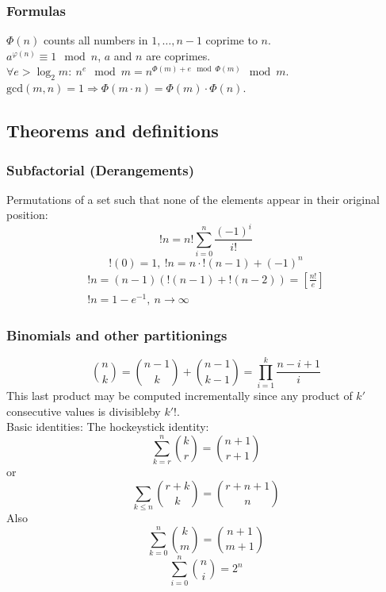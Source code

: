 \documentclass[
	a4paper,
	landscape,
	10pt,
]{article}
\begin{document}
\begin{multicols}{3}
		\subsubsection*{Formulas}
			$\Phi(n)$ counts all numbers in ${1,\hdots,n-1}$ coprime to $n$. \\
			$a^{\varphi (n)} \equiv 1 \mod n$, $a$ and $n$ are coprimes. \\
			$\forall e > \log_2 m:~ n^e \mod m = n^{\Phi(m) + e \mod \Phi(m)} \mod m$. \\
			$\text{gcd}(m,n) = 1 \Rightarrow \Phi(m\cdot n) = \Phi(m) \cdot \Phi(n)$. \\


	\subsection{Theorems and definitions}
		\subsubsection*{Subfactorial (Derangements)}
		Permutations of a set such that none of the elements appear in
		their original position:
		$$!n = n! \sum_{i=0}^{n} \frac{(-1)^i}{i!}$$
		$$!(0) = 1, ~ !n = n \cdot !(n-1) + (-1)^n$$
		\begin{gather}
			!n = (n-1)(!(n-1)+!(n-2)) = \left[\frac{n!}{e}\right] \\
			!n = 1-e^{-1},~n\rightarrow\infty
		\end{gather}

		\subsubsection*{Binomials and other partitionings}
		$$\binom{n}{k} = \binom{n-1}{k}+\binom{n-1}{k-1} =
			\prod_{i=1}^k \frac{n-i+1}{i}$$ This last product may be computed
		incrementally since any product of $k'$ consecutive values is divisibleby
		$k'!$. \\
		Basic identities: The hockeystick identity: \\
		 $$\sum_{k=r}^n \binom{k}{r}
			= \binom{n+1}{r+1}$$
		or $$\sum_{k\leq n}\binom{r+k}{k} = \binom{r+n+1}{n}$$
		Also $$\sum_{k=0}^n \binom{k}{m} = \binom{n+1}{m+1}$$
		$$\sum_{i=0}^{n} \binom{n}{i} = 2^n$$


\end{multicols}
\end{document}
